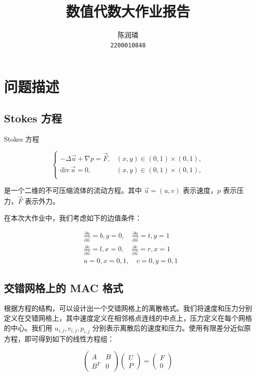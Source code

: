\documentclass{article}
\title{数值代数大作业报告}
\author{
    陈润璘 \\
    \texttt{2200010848}
}
\begin{document}
\maketitle

\section{问题描述}

\subsection{Stokes 方程}

Stokes 方程

\begin{equation*}
    \begin{cases}
        -\Delta \vec{u} + \nabla p = \vec{F}, & (x,y)\in (0,1)\times (0,1), \\
        \textrm{div}\, \vec{u} = 0, & (x,y)\in (0,1)\times (0,1), \\
    \end{cases}
\end{equation*}

是一个二维的不可压缩流体的流动方程。其中 $\vec{u} = (u,v)$ 表示速度，$p$ 表示压力，$\vec{F}$ 表示外力。

在本次大作业中，我们考虑如下的边值条件：

\begin{equation*}
    \begin{aligned}
        &\frac{\partial u}{\partial \vec{n}}=b, y=0,\quad \frac{\partial u}{\partial \vec{n}}=t, y=1\\
        &\frac{\partial v}{\partial \vec{n}}=l, x=0,\quad \frac{\partial v}{\partial \vec{n}}=r, x=1\\
        & u=0, x = 0, 1,\quad v=0, y = 0, 1
    \end{aligned}
\end{equation*}

\subsection{交错网格上的 MAC 格式}

根据方程的结构，可以设计出一个交错网格上的离散格式。我们将速度和压力分别定义在交错网格上，其中速度定义在相邻格点连线的中点上，压力定义在每个网格的中心。我们用 $u_{i,j}, v_{i,j}, p_{i,j}$ 分别表示离散后的速度和压力。使用有限差分近似原方程，即可得到如下的线性方程组：

\begin{equation*}
    \begin{pmatrix}
        A & B \\
        B^T & 0
    \end{pmatrix}
    \begin{pmatrix}
        U \\
        P
    \end{pmatrix}
    =
    \begin{pmatrix}
        F \\
        0
    \end{pmatrix}
\end{equation*}
\end{document}
